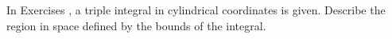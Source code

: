 {\noindent In Exercises} 
{,  a triple integral in cylindrical coordinates is given. Describe the region in space defined by the bounds of the integral.
}
